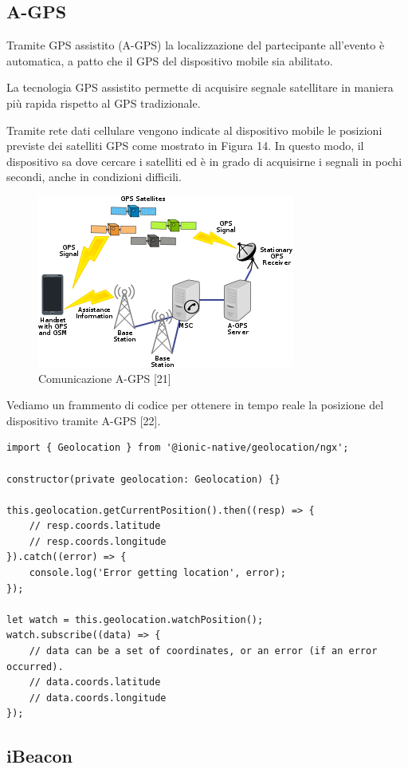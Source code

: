 \subsection{A-GPS}

Tramite GPS assistito (A-GPS) la localizzazione del partecipante all'evento è automatica,
a patto che il GPS del dispositivo mobile sia abilitato. 

La tecnologia GPS assistito permette di acquisire segnale satellitare in maniera più rapida
rispetto al GPS tradizionale.

Tramite rete dati cellulare vengono indicate al dispositivo mobile le posizioni previste dei
satelliti GPS come mostrato in Figura 14. In questo modo, il dispositivo sa dove cercare i satelliti ed è in grado di acquisirne 
i segnali in pochi secondi, anche in condizioni difficili.
\begin{figure}[H]
    \centering  
    \caption{Comunicazione A-GPS [21]}
    \includegraphics[scale=0.95]{img/cap2/gps}
\end{figure}
Vediamo un frammento di codice per ottenere in tempo reale la 
posizione del dispositivo tramite A-GPS [22].
\begin{lstlisting}
import { Geolocation } from '@ionic-native/geolocation/ngx';

constructor(private geolocation: Geolocation) {}

this.geolocation.getCurrentPosition().then((resp) => {
    // resp.coords.latitude
    // resp.coords.longitude
}).catch((error) => {
    console.log('Error getting location', error);
});

let watch = this.geolocation.watchPosition();
watch.subscribe((data) => {
    // data can be a set of coordinates, or an error (if an error occurred).
    // data.coords.latitude
    // data.coords.longitude
});
\end{lstlisting}

\subsection{iBeacon}

